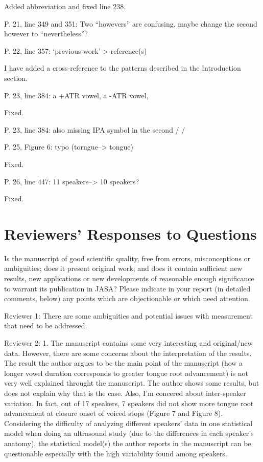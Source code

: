 \documentclass[]{article}
\begin{document}
\color{plum}

Added abbreviation and fixed line 238. \color{black}

P. 21, line 349 and 351: Two ``howevers'' are confusing. maybe change
the second however to ``nevertheless''?

P. 22, line 357: `previous work' \textgreater{} reference(s)

\color{plum}

I have added a cross-reference to the patterns described in the
Introduction section. \color{black}

P. 23, line 384: a +ATR vowel, a -ATR vowel,

\color{plum}

Fixed. \color{black}

P. 23, line 384: also missing IPA symbol in the second / /

P. 25, Figure 6: typo (torngue--\textgreater{} tongue)

\color{plum}

Fixed. \color{black}

P. 26, line 447: 11 speakers--\textgreater{} 10 speakers?

\color{plum}

Fixed. \color{black}

\hypertarget{reviewers-responses-to-questions}{%
\section{Reviewers' Responses to
Questions}\label{reviewers-responses-to-questions}}

Is the manuscript of good scientific quality, free from errors,
misconceptions or ambiguities; does it present original work; and does
it contain sufficient new results, new applications or new developments
of reasonable enough significance to warrant its publication in JASA?
Please indicate in your report (in detailed comments, below) any points
which are objectionable or which need attention.

Reviewer 1: There are some ambiguities and potential issues with
measurement that need to be addressed.

Reviewer 2: 1. The manuscript contains some very interesting and
original/new data. However, there are some concerns about the
interpretation of the results. The result the author argues to be the
main point of the manuscript (how a longer vowel duration corresponds to
greater tongue root advancement) is not very well explained throught the
manuscript. The author shows some results, but does not explain why that
is the case. Also, I'm concered about inter-speaker variation. In fact,
out of 17 speakers, 7 speakers did not show more tongue root advancement
at closure onset of voiced stops (Figure 7 and Figure 8). Considering
the difficulty of analyzing different speakers' data in one statistical
model when doing an ultrasound study (due to the differences in each
speaker's anatomy), the statistical model(s) the author reports in the
manuscript can be questionable especially with the high variability
found among speakers.
\end{document}
